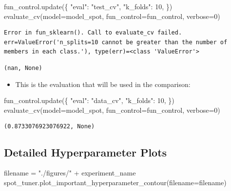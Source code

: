 \documentclass[
  letterpaper,
  DIV=11,
  numbers=noendperiod]{scrreprt}
\newenvironment{Shaded}{\begin{snugshade}}{\end{snugshade}}
\newcommand{\DecValTok}[1]{\textcolor[rgb]{0.68,0.00,0.00}{#1}}
\newcommand{\NormalTok}[1]{\textcolor[rgb]{0.00,0.23,0.31}{#1}}
\newcommand{\OperatorTok}[1]{\textcolor[rgb]{0.37,0.37,0.37}{#1}}
\newcommand{\StringTok}[1]{\textcolor[rgb]{0.13,0.47,0.30}{#1}}
\providecommand{\tightlist}{%
  \setlength{\itemsep}{0pt}\setlength{\parskip}{0pt}}\usepackage{longtable,booktabs,array}
\begin{document}
\begin{Shaded}
\begin{Highlighting}[]
\NormalTok{fun\_control.update(\{}
     \StringTok{"eval"}\NormalTok{: }\StringTok{"test\_cv"}\NormalTok{,}
     \StringTok{"k\_folds"}\NormalTok{: }\DecValTok{10}\NormalTok{,}
\NormalTok{\})}
\NormalTok{evaluate\_cv(model}\OperatorTok{=}\NormalTok{model\_spot, fun\_control}\OperatorTok{=}\NormalTok{fun\_control, verbose}\OperatorTok{=}\DecValTok{0}\NormalTok{)}
\end{Highlighting}
\end{Shaded}

\begin{verbatim}
Error in fun_sklearn(). Call to evaluate_cv failed. err=ValueError('n_splits=10 cannot be greater than the number of members in each class.'), type(err)=<class 'ValueError'>
\end{verbatim}

\begin{verbatim}
(nan, None)
\end{verbatim}

\begin{itemize}
\tightlist
\item
  This is the evaluation that will be used in the comparison:
\end{itemize}

\begin{Shaded}
\begin{Highlighting}[]
\NormalTok{fun\_control.update(\{}
     \StringTok{"eval"}\NormalTok{: }\StringTok{"data\_cv"}\NormalTok{,}
     \StringTok{"k\_folds"}\NormalTok{: }\DecValTok{10}\NormalTok{,}
\NormalTok{\})}
\NormalTok{evaluate\_cv(model}\OperatorTok{=}\NormalTok{model\_spot, fun\_control}\OperatorTok{=}\NormalTok{fun\_control, verbose}\OperatorTok{=}\DecValTok{0}\NormalTok{)}
\end{Highlighting}
\end{Shaded}

\begin{verbatim}
(0.8733076923076922, None)
\end{verbatim}

\hypertarget{detailed-hyperparameter-plots-1}{%
\subsection{Detailed Hyperparameter
Plots}\label{detailed-hyperparameter-plots-1}}

\begin{Shaded}
\begin{Highlighting}[]
\NormalTok{filename }\OperatorTok{=} \StringTok{"./figures/"} \OperatorTok{+}\NormalTok{ experiment\_name}
\NormalTok{spot\_tuner.plot\_important\_hyperparameter\_contour(filename}\OperatorTok{=}\NormalTok{filename)}
\end{Highlighting}
\end{Shaded}
\end{document}
